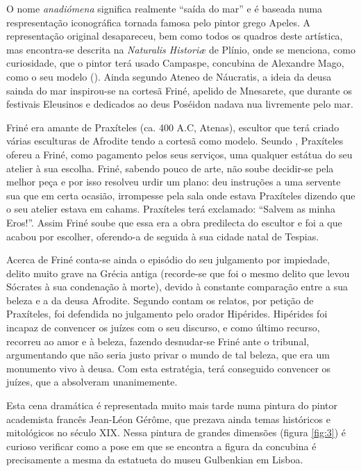 \documentclass{article}
\begin{document}
O nome \emph{anadiómena} significa realmente ``saída do mar'' e é
baseada numa respresentação iconográfica tornada famosa pelo pintor
grego Apeles. A representação original desapareceu, bem como todos os
quadros deste artística, mas encontra-se descrita na \emph{Naturalis
  Historiæ} de Plínio, onde se menciona, como curiosidade, que o
pintor terá usado Campaspe, concubina de Alexandre Mago, como o seu
modelo (\cite{wiki-anadiomena}). Ainda segundo Ateneo de Náucratis, a
ideia da deusa sainda do mar inspirou-se na cortesã Friné, apelido de
Mnesarete, que durante os festivais Eleusinos e dedicados ao deus
Poséidon nadava nua livremente pelo mar.

Friné era amante de Praxíteles (ca. 400 A.C, Atenas), escultor que
terá criado várias esculturas de Afrodite tendo a cortesã como
modelo. Seundo \cite{wiki-frine}, Praxíteles ofereu a Friné, como
pagamento pelos seus serviços, uma qualquer estátua do seu atelier à
sua escolha. Friné, sabendo pouco de arte, não soube decidir-se pela
melhor peça e por isso resolveu urdir um plano: deu instruções a uma
servente sua que em certa ocasião, irrompesse pela sala onde estava
Praxíteles dizendo que o seu atelier estava em cahams. Praxíteles terá
exclamado: ``Salvem as minha Eros!''. Assim Friné soube que essa era a
obra predilecta do escultor e foi a que acabou por escolher,
oferendo-a de seguida à sua cidade natal de Tespias.

Acerca de Friné conta-se ainda o episódio do seu julgamento por
impiedade, delito muito grave na Grécia antiga (recorde-se que foi o
mesmo delito que levou Sócrates à sua condenação à morte), devido à
constante comparação entre a sua beleza e a da deusa Afrodite. Segundo
contam os relatos, por petição de Praxíteles, foi defendida no
julgamento pelo orador Hipérides. Hipérides foi incapaz de convencer
os juízes com o seu discurso, e como último recurso, recorreu ao amor
e à beleza, fazendo desnudar-se Friné ante o tribunal, argumentando
que não seria justo privar o mundo de tal beleza, que era um monumento
vivo à deusa. Com esta estratégia, terá conseguido convencer os
juízes, que a absolveram unanimemente.

Esta cena dramática é representada muito mais tarde numa pintura do
pintor academista francês Jean-Léon Gérôme, que prezava ainda temas
históricos e mitológicos no século XIX. Nessa pintura de grandes
dimensões (figura \ref{fig:3}) é curioso verificar como a pose em que
se encontra a figura da concubina é precisamente a mesma da estatueta
do museu Gulbenkian em Lisboa.
\end{document}
